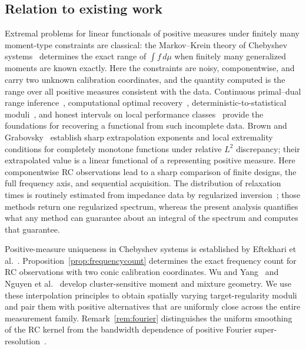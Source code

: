 \documentclass[10pt]{amsart}
\theoremstyle{definition}
\theoremstyle{remark}
\theoremstyle{plain}
\newcommand{\dd}{\,d}
\begin{document}
\subsection{Relation to existing work}
Extremal problems for linear functionals of positive measures under finitely many moment-type constraints are classical: the Markov--Krein theory of Chebyshev systems~\cite{karlinstudden,kreinnudelman} determines the exact range of $\int f\dd\mu$ when finitely many generalized moments are known exactly. Here the constraints are noisy, componentwise, and carry two unknown calibration coordinates, and the quantity computed is the range over all positive measures consistent with the data. Continuous primal--dual range inference~\cite{stark}, computational optimal recovery~\cite{ettehad}, deterministic-to-statistical moduli~\cite{donoho}, and honest intervals on local performance classes~\cite{cailow} provide the foundations for recovering a functional from such incomplete data. Brown and Grabovsky~\cite{browngrabovsky} establish sharp extrapolation exponents and local extremality conditions for completely monotone functions under relative $L^2$ discrepancy; their extrapolated value is a linear functional of a representing positive measure. Here componentwise RC observations lead to a sharp comparison of finite designs, the full frequency axis, and sequential acquisition. The distribution of relaxation times is routinely estimated from impedance data by regularized inversion~\cite{ciucci,wan}; those methods return one regularized spectrum, whereas the present analysis quantifies what any method can guarantee about an integral of the spectrum and computes that guarantee.

Positive-measure uniqueness in Chebyshev systems is established by Eftekhari et al.~\cite[Proposition~8]{eftekhari}. Proposition~\ref{prop:frequencycount} determines the exact frequency count for RC observations with two conic calibration coordinates. Wu and Yang~\cite[Proposition~5]{wuyang} and Nguyen et al.~\cite[Theorem~5 and Appendix~A.6]{nguyen} develop cluster-sensitive moment and mixture geometry. We use these interpolation principles to obtain spatially varying target-regularity moduli and pair them with positive alternatives that are uniformly close across the entire measurement family. Remark~\ref{rem:fourier} distinguishes the uniform smoothing of the RC kernel from the bandwidth dependence of positive Fourier super-resolution~\cite{liuammari}.
\end{document}
